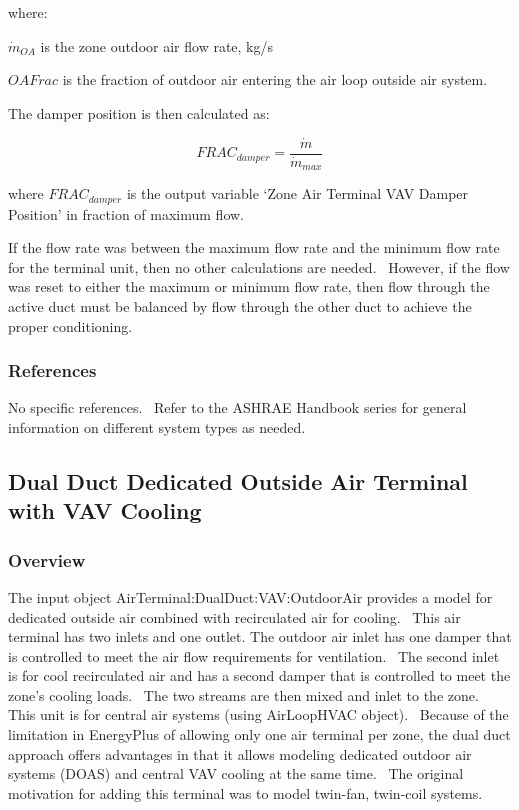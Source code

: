 where:

\(\dot m_{OA}\) is the zone outdoor air flow rate, kg/s

\(OAFrac\) is the fraction of outdoor air entering the air loop outside air system.

The damper position is then calculated as:

\begin{equation}
  FRAC_{damper} = \frac{\dot{m}}{\dot{m}_{max}}
\end{equation}

where \(FRA{C_{damper}}\) is the output variable `Zone Air Terminal VAV Damper Position' in fraction of maximum flow.

If the flow rate was between the maximum flow rate and the minimum flow rate for the terminal unit, then no other calculations are needed.~ However, if the flow was reset to either the maximum or minimum flow rate, then flow through the active duct must be balanced by flow through the other duct to achieve the proper conditioning.

\subsubsection{References}\label{references-5}

No specific references.~ Refer to the ASHRAE Handbook series for general information on different system types as needed.

\subsection{Dual Duct Dedicated Outside Air Terminal with VAV Cooling}\label{dual-duct-dedicated-outside-air-terminal-with-vav-cooling}

\subsubsection{Overview}\label{overview-5-000}

The input object AirTerminal:DualDuct:VAV:OutdoorAir provides a model for dedicated outside air combined with recirculated air for cooling.~ This air terminal has two inlets and one outlet. The outdoor air inlet has one damper that is controlled to meet the air flow requirements for ventilation.~ The second inlet is for cool recirculated air and has a second damper that is controlled to meet the zone's cooling loads.~ The two streams are then mixed and inlet to the zone.~ This unit is for central air systems (using AirLoopHVAC object). ~Because of the limitation in EnergyPlus of allowing only one air terminal per zone, the dual duct approach offers advantages in that it allows modeling dedicated outdoor air systems (DOAS) and central VAV cooling at the same time.~ The original motivation for adding this terminal was to model twin-fan, twin-coil systems.

